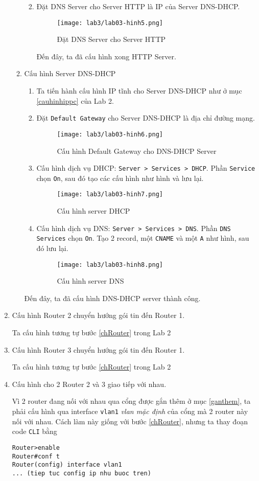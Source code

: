 \documentclass[]{article}
\begin{document}
\begin{enumerate}
\begin{enumerate}
\begin{enumerate}
\begin{figure}[H]
\end{figure}
\item Đặt DNS Server cho Server HTTP là IP của Server DNS-DHCP.
\begin{figure}[H]
\centering
\texttt{[image: lab3/lab03-hinh5.png]}
\caption{Đặt DNS Server cho Server HTTP}
\end{figure}
Đến đây, ta đã cấu hình xong HTTP Server.
\end{enumerate}
\item Cấu hình Server DNS-DHCP\label{lab3:cauhinhdnshttp}
\begin{enumerate}
\item Ta tiến hành cấu hình IP tĩnh cho Server DNS-DHCP như ở mục \ref{cauhinhippc} của Lab 2.
\item Đặt \texttt{Default Gateway} cho Server DNS-DHCP là địa chỉ đường mạng.
\begin{figure}[H]
\centering
\texttt{[image: lab3/lab03-hinh6.png]}
\caption{Cấu hình Default Gateway cho DNS-DHCP Server}
\end{figure}
\item Cấu hình dịch vụ DHCP: \texttt{Server > Services > DHCP}. Phần \texttt{Service} chọn \texttt{On}, sau đó tạo các cấu hình như hình và lưu lại.
\begin{figure}[H]
\centering
\texttt{[image: lab3/lab03-hinh7.png]}
\caption{Cấu hình server DHCP}
\end{figure}
\item Cấu hình dịch vụ DNS: \texttt{Server > Services > DNS}. Phần \texttt{DNS Services} chọn \texttt{On}. Tạo 2 record, một \texttt{CNAME} và một \texttt{A} như hình, sau đó lưu lại.
\begin{figure}[H]
\centering
\texttt{[image: lab3/lab03-hinh8.png]}
\caption{Cấu hình server DNS}
\end{figure}
\end{enumerate}
Đến đây, ta đã cấu hình DNS-DHCP server thành công.
\end{enumerate}
\item Cấu hình Router 2 chuyển hướng gói tin đến Router 1.

Ta cấu hình tương tự bước \ref{chRouter} trong Lab 2
\item Cấu hình Router 3 chuyển hướng gói tin đến Router 1.

Ta cấu hình tương tự bước \ref{chRouter} trong Lab 2
\item Cấu hình cho 2 Router 2 và 3 giao tiếp với nhau.

Vì 2 router đang nối với nhau qua cổng được gắn thêm ở mục \ref{ganthem}, ta phải cấu hình qua interface \texttt{vlan1} \textit{vlan mặc định} của cổng mà 2 router này nối với nhau.\cite{cisco:vlan} Cách làm này giống với bước \ref{chRouter}, nhưng ta thay đoạn code \texttt{CLI} bằng
\begin{lstlisting}
Router>enable
Router#conf t
Router(config) interface vlan1
... (tiep tuc config ip nhu buoc tren)
\end{lstlisting}
\end{enumerate}
\end{document}
